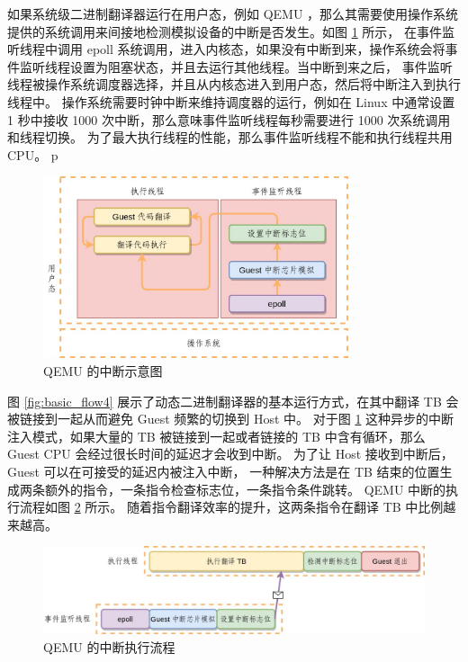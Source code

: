 如果系统级二进制翻译器运行在用户态，例如 QEMU ，那么其需要使用操作系统提供的系统调用来间接地检测模拟设备的中断是否发生。如图 \ref{fig:qemu_interrupt} 所示，
在事件监听线程中调用 epoll 系统调用，进入内核态，如果没有中断到来，操作系统会将事件监听线程设置为阻塞状态，并且去运行其他线程。当中断到来之后，
事件监听线程被操作系统调度器选择，并且从内核态进入到用户态，然后将中断注入到执行线程中。
操作系统需要时钟中断来维持调度器的运行，例如在 Linux 中通常设置 1 秒中接收 1000 次中断，那么意味事件监听线程每秒需要进行 1000 次系统调用和线程切换。
为了最大执行线程的性能，那么事件监听线程不能和执行线程共用 CPU。
p
\begin{figure}[!htbp]
	\centering
	\includegraphics[width=0.8\textwidth]{./images/qemu-interrupt.jpg}
	\caption{QEMU 的中断示意图}
	\label{fig:qemu_interrupt}
\end{figure}

图 \ref{fig:basic_flow4} 展示了动态二进制翻译器的基本运行方式，在其中翻译 TB 会被链接到一起从而避免 Guest 频繁的切换到 Host 中。
对于图 \ref{fig:qemu_interrupt} 这种异步的中断注入模式，如果大量的 TB 被链接到一起或者链接的 TB 中含有循环，那么 Guest CPU 会经过很长时间的延迟才会收到中断。
为了让 Host 接收到中断后，Guest 可以在可接受的延迟内被注入中断，
一种解决方法是在 TB 结束的位置生成两条额外的指令，一条指令检查标志位，一条指令条件跳转。
QEMU 中断的执行流程如图 \ref{fig:qemu_interrupt_flow} 所示。
随着指令翻译效率的提升，这两条指令在翻译 TB 中比例越来越高。

\begin{figure}[!htbp]
	\centering
	\includegraphics[width=1.0\textwidth]{./images/qemu-interrupt-codeflow.jpg}
	\caption{QEMU 的中断执行流程}
	\label{fig:qemu_interrupt_flow}
\end{figure}


